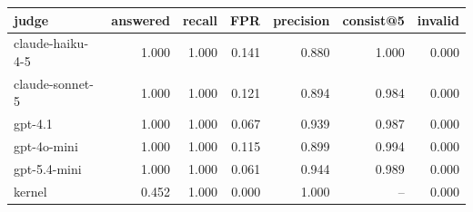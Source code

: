 \begin{tabular}{lrrrrrr}
\toprule
judge & answered & recall & FPR & precision & consist@5 & invalid \\
\midrule
claude-haiku-4-5 & 1.000 & 1.000 & 0.141 & 0.880 & 1.000 & 0.000 \\
claude-sonnet-5 & 1.000 & 1.000 & 0.121 & 0.894 & 0.984 & 0.000 \\
gpt-4.1 & 1.000 & 1.000 & 0.067 & 0.939 & 0.987 & 0.000 \\
gpt-4o-mini & 1.000 & 1.000 & 0.115 & 0.899 & 0.994 & 0.000 \\
gpt-5.4-mini & 1.000 & 1.000 & 0.061 & 0.944 & 0.989 & 0.000 \\
kernel & 0.452 & 1.000 & 0.000 & 1.000 & -- & 0.000 \\
\bottomrule
\end{tabular}
